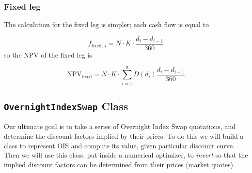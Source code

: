 \subsubsection{Fixed leg}\label{fixed-leg}

The calculation for the fixed leg is simpler; each cash flow is equal to

\begin{equation}
f_{\mathrm{fixed},~i}=N\cdot K\cdot \frac{d_i - d_{i-1}}{360}
\end{equation}
so the NPV of the fixed leg is

\begin{equation}
\mathrm{NPV}_{\mathrm{fixed}} = N\cdot K\cdot \sum_{i=1}^{n}D(d_{i})\frac{d_i - d_{i-1}}{360}
\end{equation}

\subsection{\texttt{OvernightIndexSwap} Class}\label{discount-factor-determination-from-market-quotes}

Our ultimate goal is to take a series of Overnight Index Swap
quotations, and determine the discount factors implied by their prices.
To do this we will build a class to represent OIS and compute its value,
given particular discount curve. Then we will use this class, put inside
a numerical optimizer, to \emph{invert} so that the implied discount
factors can be determined from their prices (market quotes).

